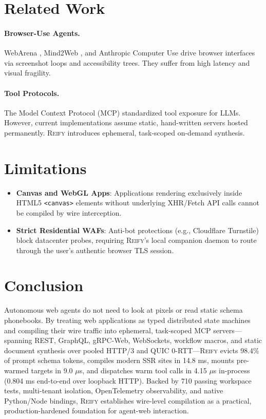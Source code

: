 \documentclass[10pt,twocolumn]{article}
\begin{document}
\section{Related Work}
\paragraph{Browser-Use Agents.} WebArena \cite{zhou2023webarena}, Mind2Web \cite{deng2023mind2web}, and Anthropic Computer Use \cite{anthropic2024computeruse} drive browser interfaces via screenshot loops and accessibility trees. They suffer from high latency and visual fragility.

\paragraph{Tool Protocols.} The Model Context Protocol (MCP) standardized tool exposure for LLMs. However, current implementations assume static, hand-written servers hosted permanently. \textsc{Reify} introduces ephemeral, task-scoped on-demand synthesis.

\section{Limitations}
\begin{itemize}
    \item \textbf{Canvas and WebGL Apps}: Applications rendering exclusively inside HTML5 \texttt{<canvas>} elements without underlying XHR/Fetch API calls cannot be compiled by wire interception.
    \item \textbf{Strict Residential WAFs}: Anti-bot protections (e.g., Cloudflare Turnstile) block datacenter probes, requiring \textsc{Reify}'s local companion daemon to route through the user's authentic browser TLS session.
\end{itemize}

\section{Conclusion}
Autonomous web agents do not need to look at pixels or read static schema phonebooks. By treating web applications as typed distributed state machines and compiling their wire traffic into ephemeral, task-scoped MCP servers---spanning REST, GraphQL, gRPC-Web, WebSockets, workflow macros, and static document synthesis over pooled HTTP/3 and QUIC 0-RTT---\textsc{Reify} evicts 98.4\% of prompt schema tokens, compiles modern SSR sites in 14.8 ms, mounts pre-warmed targets in 9.0 $\mu$s, and dispatches warm tool calls in 4.15 $\mu$s in-process (0.804 ms end-to-end over loopback HTTP). Backed by 710 passing workspace tests, multi-tenant isolation, OpenTelemetry observability, and native Python/Node bindings, \textsc{Reify} establishes wire-level compilation as a practical, production-hardened foundation for agent-web interaction.
\end{document}
